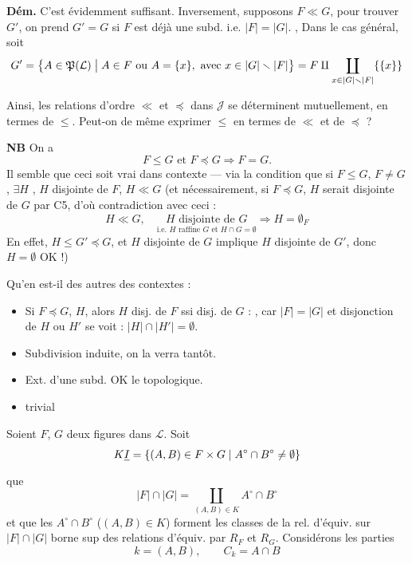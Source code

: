 \documentclass[11pt,a4paper]{article}
\begin{document}
\textbf{Dém.} C'est évidemment suffisant. Inversement, supposons $F \ll G$, pour trouver $G'$, on prend $G' = G$ si $F$ est déjà une subd. i.e. $|F| = |G|$. , Dans le cas général, soit
\[
  G' = \bigl\{A \in \mathfrak{P}(\mathcal{L}) \bigm| A \in F \text{ ou } A = \{x\}, \text{ avec } x \in |G| \smallsetminus |F|\bigr\}
  = F \amalg \coprod_{x \in |G| \smallsetminus |F|} \{\{x\}\}
\]


Ainsi, les relations d'ordre $\ll$ et $\preccurlyeq$ dans $\mathcal{J}$ se déterminent mutuellement, en termes de $\leq$. Peut-on de même exprimer $\leq$ en termes de $\ll$ et de $\preccurlyeq$ ?

\textbf{NB} On a
\[
  F \leq G \text{ et } F \preccurlyeq G \Longrightarrow F = G .
\]
Il semble que ceci soit vrai dans \struck{\ill{}} contexte — via la condition que si $F \leq G$, $F \neq G$, $\exists H$ , $H$ disjointe de $F$, $H \ll G$ (et nécessairement, si $F \preccurlyeq G$, $H$ serait disjointe de $G$ par C5, d'où contradiction avec ceci : 
\[
  H \ll G, \quad \underset{\text{i.e. } H \text{ raffine } G \text{ et } H \cap G = \emptyset}{H \text{ disjointe de } G} \Longrightarrow H = \emptyset_{F}
\]
\struck{\ill{}} En effet, $H \leq G' \preccurlyeq G$, et $H$ disjointe de $G$  implique $H$ disjointe de $G'$, donc $H = \emptyset$ OK !)


Qu'en est-il des autres \ill{} des contextes :
\begin{itemize}
  \item[\textbf{C5}] Si $F \preccurlyeq G$, $H$, alors $H$ disj. de $F$ ssi disj. de $G$ : , car $|F| = |G|$ et disjonction de $H$ ou $H'$ se voit  : $|H| \cap |H'| = \emptyset$.
  \item[\textbf{C6}] \struck{\ill{}}Subdivision induite, on la verra tantôt.
  \item[\textbf{C7}] Ext. d'une subd. OK \ill{} le \ill{} topologique.
  \item[\textbf{C8}] trivial
\end{itemize}

 Soient $F$, $G$ deux figures  dans $\mathcal{L}$.  Soit 
\[
  K \struck{I} = \{(A,B) \in F \times G \mid A^{\circ} \cap B^{\circ} \neq \emptyset\}
\]
 que
\[
  |F| \cap |G| = \coprod_{(A,B) \in K} A^{\circ} \cap B^{\circ}
\]
et que les  $A^{\circ} \cap B^{\circ}$ ($(A,B) \in K$) forment les classes de la rel. d'équiv. sur $|F| \cap |G|$ borne sup des relations d'équiv.   par $R_{F}$ et $R_{G}$. Considérons   les parties
\[
  k = (A,B), \qquad C_{k} = A \cap B
\]
\end{document}
